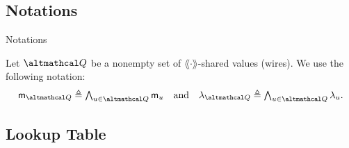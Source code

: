 \documentclass[../250326_cryptlab_flute_security.tex]{subfiles}
\begin{document}
\subsection{Notations}
\begin{frame}{Notations}
    \begin{itemize}
        \ii
        Let \(\mcal{Q}\) be a nonempty set of
        \(\lang\cdot\rang\)-shared values (wires).
        We use the following notation:
        \[\textstyle
            \msf{m}_{\mcal{Q}} \triangleq \bigwedge_{u \in \mcal{Q}} \msf{m}_u
            \quad\text{and}\quad
            \lambda_{\mcal{Q}} \triangleq \bigwedge_{u \in \mcal{Q}} \lambda_u.
        \]
    \end{itemize}
\end{frame}

\subsection{Lookup Table}
\end{document}

